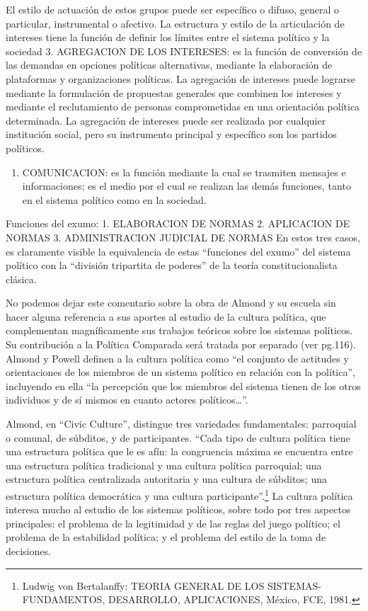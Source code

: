 \documentclass[
]{book}
\providecommand{\tightlist}{%
  \setlength{\itemsep}{0pt}\setlength{\parskip}{0pt}}
\begin{document}
El estilo de actuación de estos grupos puede ser específico o difuso, general o particular, instrumental o afectivo. La estructura y estilo de la articulación de intereses tiene la función de definir los límites entre el sistema político y la sociedad 3. AGREGACION DE LOS INTERESES: es la función de conversión de las demandas en opciones políticas alternativas, mediante la elaboración de plataformas y organizaciones políticas. La agregación de intereses puede lograrse mediante la formulación de propuestas generales que combinen los intereses y mediante el reclutamiento de personas comprometidas en una orientación política determinada. La agregación de intereses puede ser realizada por cualquier institución social, pero su instrumento principal y específico son los partidos políticos.

\begin{enumerate}
\def\labelenumi{\arabic{enumi}.}
\setcounter{enumi}{3}
\tightlist
\item
  COMUNICACION: es la función mediante la cual se trasmiten mensajes e informaciones; es el medio por el cual se realizan las demás funciones, tanto en el sistema político como en la sociedad.
\end{enumerate}

Funciones del exumo: 1. ELABORACION DE NORMAS 2. APLICACION DE NORMAS 3. ADMINISTRACION JUDICIAL DE NORMAS En estos tres casos, es claramente visible la equivalencia de estas ``funciones del exumo'' del sistema político con la ``división tripartita de poderes'' de la teoría constitucionalista clásica.

No podemos dejar este comentario sobre la obra de Almond y su escuela sin hacer alguna referencia a sus aportes al estudio de la cultura política, que complementan magníficamente sus trabajos teóricos sobre los sistemas políticos. Su contribución a la Política Comparada será tratada por separado (ver pg.116). Almond y Powell definen a la cultura política como ``el conjunto de actitudes y orientaciones de los miembros de un sistema político en relación con la política'', incluyendo en ella ``la percepción que los miembros del sistema tienen de los otros individuos y de sí mismos en cuanto actores políticos\ldots{}''.

Almond, en ``Civic Culture'', distingue tres variedades fundamentales: parroquial o comunal, de súbditos, y de participantes. ``Cada tipo de cultura política tiene una estructura política que le es afín: la congruencia máxima se encuentra entre una estructura política tradicional y una cultura política parroquial; una estructura política centralizada autoritaria y una cultura de súbditos; una estructura política democrática y una cultura participante''.\footnote{Ludwig von Bertalanffy: TEORIA GENERAL DE LOS SISTEMAS- FUNDAMENTOS, DESARROLLO, APLICACIONES, México, FCE, 1981.} La cultura política interesa mucho al estudio de los sistemas políticos, sobre todo por tres aspectos principales: el problema de la legitimidad y de las reglas del juego político; el problema de la estabilidad política; y el problema del estilo de la toma de decisiones.
\end{document}
